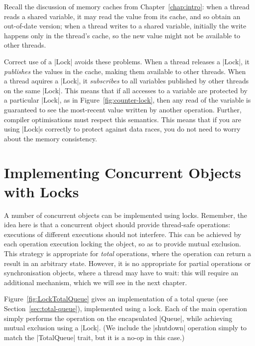 
Recall the discussion of memory caches from Chapter~\ref{chap:intro}: when a
thread reads a shared variable, it may read the value from its cache, and so
obtain an out-of-date version; when a thread writes to a shared variable,
initially the write happens only in the thread's cache, so the new value might
not be available to other threads.

Correct use of a |Lock| avoids these problems.  When a thread releases a
|Lock|, it \emph{publishes} the values in the cache, making them available to
other threads.  When a thread aquires a |Lock|, it \emph{subscribes} to all
variables published by other threads on the same |Lock|.  This means that if
all accesses to a variable are protected by a particular |Lock|, as in
Figure~\ref{fig:counter-lock}, then any read of the variable is guaranteed to
see the most-recent value written by another operation.  Further, compiler
optimisations must respect this semantics.  This means that if you are using
|Lock|s correctly to protect against data races, you do not need to worry
about the memory consistency.


\section{Implementing Concurrent Objects with Locks}

A number of concurrent objects can be implemented using locks.  Remember, the
idea here is that a concurrent object should provide thread-safe operations:
executions of different executions should not interfere.  This can be achieved
by each operation execution locking the object, so as to provide mutual
exclusion.  This strategy is appropriate for \emph{total} operations, where
the operation can return a result in an arbitrary state.  However, it is no
appropriate for partial operations or synchronisation objects, where a thread
may have to wait: this will require an additional mechanism, which we will see
in the next chapter.

Figure~\ref{fig:LockTotalQueue} gives an implementation of a total queue (see
Section~\ref{sec:total-queue}), implemented using a lock.  Each of the main
operation simply performs the operation on the encapsulated |Queue|, while
achieving mutual exclusion using a |Lock|.  (We include the |shutdown|
operation simply to match the |TotalQueue| trait, but it is a no-op in this
case.) 

